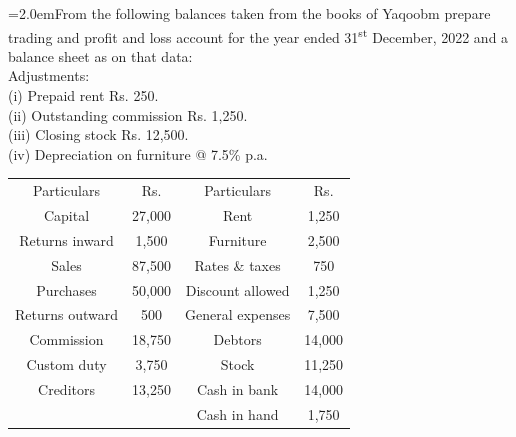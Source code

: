 \documentclass[11pt,a4paper]{article}
\newcommand{\lqn}[2]{\Needspace{6\baselineskip}\par\medskip\noindent\hangindent=2.0em\hangafter=1\makebox[2.0em][l]{\textbf{#1.}}#2\par}
\begin{document}
\lqn{99}{From the following balances taken from the books of Yaqoobm prepare trading and profit and loss account for the year ended 31\textsuperscript{st} December, 2022 and a balance sheet as on that data:\\
Adjustments:\\
(i) Prepaid rent Rs. 250.\\
(ii) Outstanding commission Rs. 1,250.\\
(iii) Closing stock Rs. 12,500.\\
(iv) Depreciation on furniture @ 7.5\% p.a.\par
\par\smallskip\noindent\hspace*{1.2em}\begin{tabular}{|cccc|}
\hline
Particulars & Rs. & Particulars & Rs. \\
Capital & 27,000 & Rent & 1,250 \\
Returns inward & 1,500 & Furniture & 2,500 \\
Sales & 87,500 & Rates \& taxes & 750 \\
Purchases & 50,000 & Discount allowed & 1,250 \\
Returns outward & 500 & General expenses & 7,500 \\
Commission & 18,750 & Debtors & 14,000 \\
Custom duty & 3,750 & Stock & 11,250 \\
Creditors & 13,250 & Cash in bank & 14,000 \\
 &  & Cash in hand & 1,750 \\
\hline
\end{tabular}\par\smallskip
}
\end{document}
